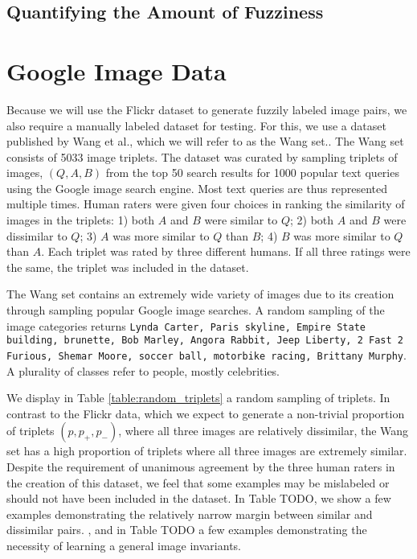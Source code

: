 \subsection{Quantifying the Amount of Fuzziness}





\section{Google Image Data}
Because we will use the Flickr dataset to generate fuzzily labeled image pairs, we also require a manually labeled dataset for testing. For this, we use a dataset published by Wang et al., which we will refer to as the Wang set.\cite{wang2014learning}. 
The Wang set consists of 5033 image triplets. The dataset was curated by sampling triplets of images, $(Q, A, B)$ from the top 50 search results for 1000 popular text queries using the Google image search engine. Most text queries are thus represented multiple times. Human raters were given four choices in ranking the similarity of images in the triplets: 1) both $A$ and $B$ were similar to $Q$; 2) both $A$ and $B$ were dissimilar to $Q$; 3) $A$ was more similar to $Q$ than $B$; 4) $B$ was more similar to $Q$ than $A$. Each triplet was rated by three different humans. If all three ratings were the same, the triplet was included in the dataset.

The Wang set contains an extremely wide variety of images due to its creation through sampling popular Google image searches. A random sampling of the image categories returns \texttt{\justify Lynda Carter, Paris skyline, Empire State building, brunette, Bob Marley, Angora Rabbit, Jeep Liberty, 2 Fast 2 Furious, Shemar Moore, soccer ball, motorbike racing, Brittany Murphy}. A plurality of classes refer to people, mostly celebrities.

We display in Table \ref{table:random_triplets} a random sampling of triplets. In contrast to the Flickr data, which we expect to generate a non-trivial proportion of triplets $(p, p_+, p_-)$, where all three images are relatively dissimilar, the Wang set has a high proportion of triplets where all three images are extremely similar. Despite the requirement of unanimous agreement by the three human raters in the creation of this dataset, we feel that some examples may be mislabeled or should not have been included in the dataset. In Table TODO, we show a few examples demonstrating the relatively narrow margin between similar and dissimilar pairs. , and in Table TODO a few examples demonstrating the necessity of learning a general image invariants.

